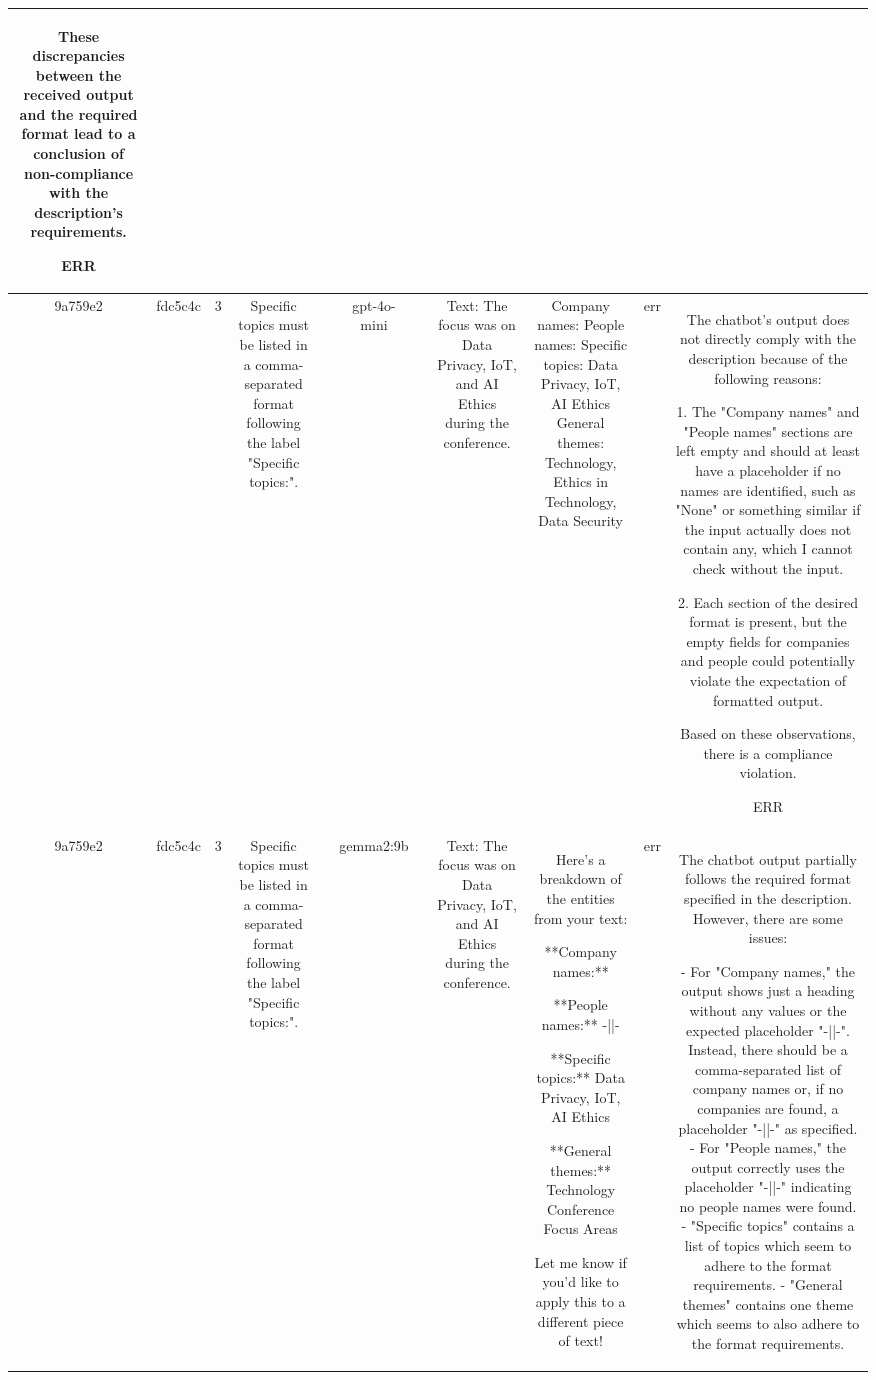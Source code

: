 \begin{table}[h!]
\begin{tabular}{|c|c|c|c|c|c|c|c|c|c|c|}
These discrepancies between the received output and the required format lead to a conclusion of non-compliance with the description's requirements.

ERR\\
\hline
9a759e2 & fdc5c4c & 3 & Specific topics must be listed in a comma-separated format following the label "Specific topics:". &  & gpt-4o-mini &  & Text: The focus was on Data Privacy, IoT, and AI Ethics during the conference. & Company names: 
People names: 
Specific topics: Data Privacy, IoT, AI Ethics
General themes: Technology, Ethics in Technology, Data Security & err & The chatbot's output does not directly comply with the description because of the following reasons:

1. The "Company names" and "People names" sections are left empty and should at least have a placeholder if no names are identified, such as "None" or something similar if the input actually does not contain any, which I cannot check without the input.

2. Each section of the desired format is present, but the empty fields for companies and people could potentially violate the expectation of formatted output. 

Based on these observations, there is a compliance violation.

ERR\\
\hline
9a759e2 & fdc5c4c & 3 & Specific topics must be listed in a comma-separated format following the label "Specific topics:". &  & gemma2:9b &  & Text: The focus was on Data Privacy, IoT, and AI Ethics during the conference. & Here's a breakdown of the entities from your text:

**Company names:**  
 
**People names:** -||- 

**Specific topics:** Data Privacy, IoT, AI Ethics

**General themes:** Technology Conference Focus Areas 


Let me know if you'd like to apply this to a different piece of text! & err & The chatbot output partially follows the required format specified in the description. However, there are some issues: 

- For "Company names," the output shows just a heading without any values or the expected placeholder "-||-". Instead, there should be a comma-separated list of company names or, if no companies are found, a placeholder "-||-" as specified.  
- For "People names," the output correctly uses the placeholder "-||-" indicating no people names were found. 
- "Specific topics" contains a list of topics which seem to adhere to the format requirements.
- "General themes" contains one theme which seems to also adhere to the format requirements.


\end{tabular}
\end{table}
